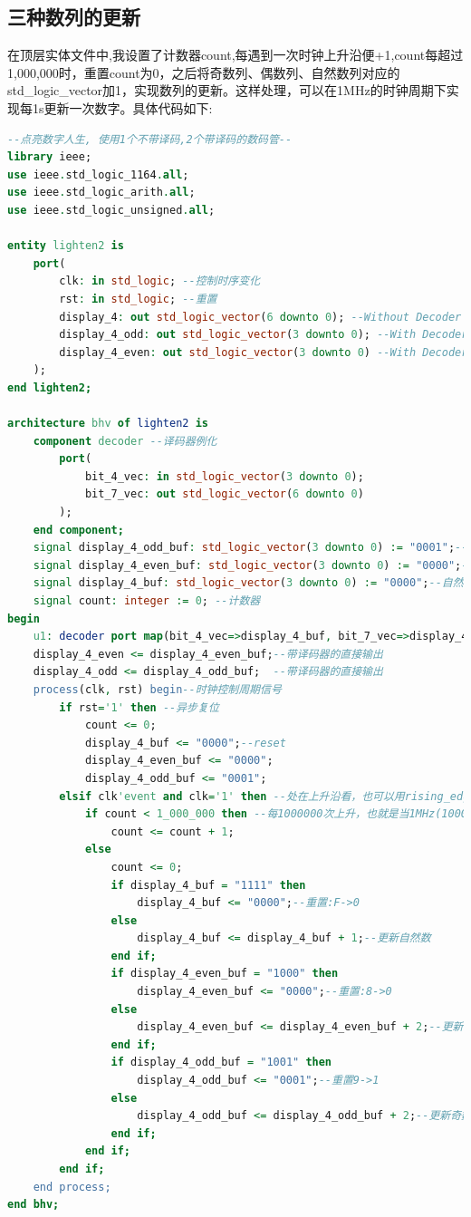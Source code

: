 \documentclass[UTF8, onecolumn, a4paper]{article}
\begin{document}
\subsection{三种数列的更新}
在顶层实体文件中,我设置了计数器count,每遇到一次时钟上升沿便+1,count每超过1,000,000时，重置count为0，之后将奇数列、偶数列、自然数列对应的std\_logic\_vector加1，实现数列的更新。这样处理，可以在1MHz的时钟周期下实现每1s更新一次数字。具体代码如下:
\begin{lstlisting}[language={VHDL}, title={lighten2.vhd}]
--点亮数字人生, 使用1个不带译码,2个带译码的数码管--
library ieee;
use ieee.std_logic_1164.all;
use ieee.std_logic_arith.all;
use ieee.std_logic_unsigned.all;

entity lighten2 is 
	port(
		clk: in std_logic; --控制时序变化
		rst: in std_logic; --重置
		display_4: out std_logic_vector(6 downto 0); --Without Decoder
		display_4_odd: out std_logic_vector(3 downto 0); --With Decoder
		display_4_even: out std_logic_vector(3 downto 0) --With Decoder
	);
end lighten2;

architecture bhv of lighten2 is
	component decoder --译码器例化
		port(
			bit_4_vec: in std_logic_vector(3 downto 0);
			bit_7_vec: out std_logic_vector(6 downto 0)
		);
	end component;
	signal display_4_odd_buf: std_logic_vector(3 downto 0) := "0001";--奇数
	signal display_4_even_buf: std_logic_vector(3 downto 0) := "0000";--偶数
	signal display_4_buf: std_logic_vector(3 downto 0) := "0000";--自然数
	signal count: integer := 0; --计数器
begin
	u1: decoder port map(bit_4_vec=>display_4_buf, bit_7_vec=>display_4);--译码
	display_4_even <= display_4_even_buf;--带译码器的直接输出
	display_4_odd <= display_4_odd_buf;  --带译码器的直接输出
	process(clk, rst) begin--时钟控制周期信号
		if rst='1' then --异步复位
			count <= 0;
			display_4_buf <= "0000";--reset
			display_4_even_buf <= "0000";
			display_4_odd_buf <= "0001";
		elsif clk'event and clk='1' then --处在上升沿看，也可以用rising_edge(clk)
			if count < 1_000_000 then --每1000000次上升，也就是当1MHz(1000ns)时钟频率时，1s更新1次(仿真的时候设为1, 即一次上升沿更新一次)
				count <= count + 1;
			else
				count <= 0;
				if display_4_buf = "1111" then
					display_4_buf <= "0000";--重置:F->0
				else
					display_4_buf <= display_4_buf + 1;--更新自然数
				end if;
				if display_4_even_buf = "1000" then
					display_4_even_buf <= "0000";--重置:8->0
				else
					display_4_even_buf <= display_4_even_buf + 2;--更新偶数
				end if;
				if display_4_odd_buf = "1001" then
					display_4_odd_buf <= "0001";--重置9->1
				else
					display_4_odd_buf <= display_4_odd_buf + 2;--更新奇数
				end if;
			end if;
		end if;
	end process;
end bhv;
\end{lstlisting}
\end{document}
